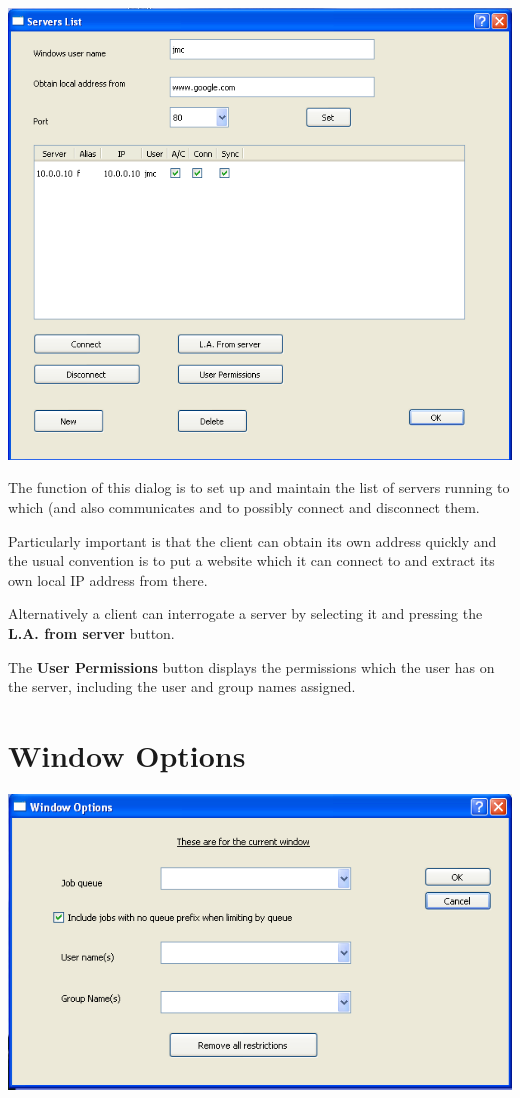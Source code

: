 \includegraphics{img/btqwnewhostsetlist.png}

The function of this dialog is to set up and maintain the list of servers running \ProductName{} to which 
(and also  communicates and to possibly connect and disconnect them.

Particularly important is that the client can obtain its own address quickly and the usual convention is to put a
website which it can connect to and extract its own local IP address from there.

Alternatively a client can interrogate a server by selecting it and pressing the \textbf{L.A. from server} button.

The \textbf{User Permissions} button displays the permissions which the user has on the server, including
the user and group names assigned.

\section{Window Options}

\includegraphics{img/btqwwinoptsdlg.png}

